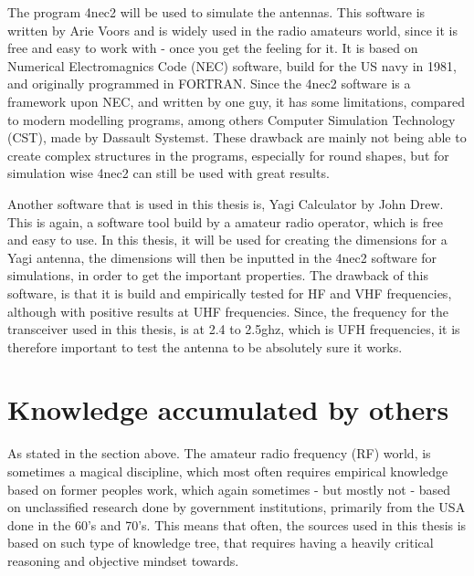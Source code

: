 The program 4nec2\cite{4nec2} will be used to simulate the antennas. This software is written by Arie Voors and is widely used in the radio amateurs world, since it is free and easy to work with - once you get the feeling for it. It is based on Numerical Electromagnics Code (NEC) software\cite{nec}, build for the US navy in 1981, and originally programmed in FORTRAN\cite{Fortran}. Since the 4nec2 software is a framework upon NEC, and written by one guy, it has some limitations, compared to modern modelling programs, among others Computer Simulation Technology (CST), made by Dassault Systemst\cite{Dassault}. These drawback are mainly not being able to create complex structures in the programs, especially for round shapes, but for simulation wise 4nec2 can still be used with great results. 

Another software that is used in this thesis is, Yagi Calculator by John Drew\cite{yagical}. This is again, a software tool build by a amateur radio operator, which is free and easy to use. In this thesis, it will be used for creating the dimensions for a Yagi antenna, the dimensions will then be inputted in the 4nec2 software for simulations, in order to get the important properties. The drawback of this software, is that it is build and empirically tested for HF and VHF frequencies, although with positive results at UHF frequencies. Since, the frequency for the transceiver used in this thesis, is at 2.4 to 2.5ghz, which is UFH frequencies, it is therefore important to test the antenna to be absolutely sure it works.  


\section{Knowledge accumulated by others}
As stated in the section above. The amateur radio frequency (RF) world, is sometimes a magical discipline, which most often requires empirical knowledge based on former peoples work, which again sometimes - but mostly not - based on unclassified research done by government institutions, primarily from the USA done in the 60's and 70's. This means that often, the sources used in this thesis is based on such type of knowledge tree, that requires having a heavily critical reasoning and objective mindset towards.


